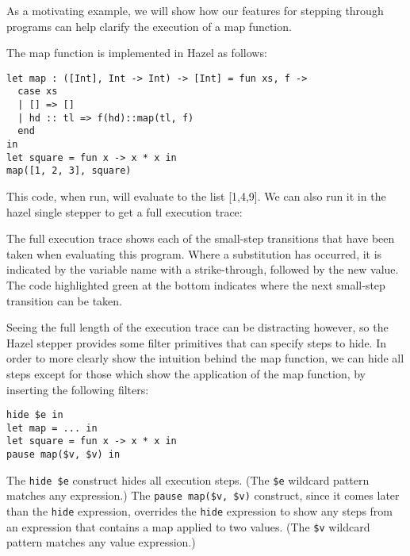 


As a motivating example, we will show how our features for stepping through programs can help clarify the execution of a map function.

The map function is implemented in Hazel as follows:

\begin{verbatim}
let map : ([Int], Int -> Int) -> [Int] = fun xs, f ->
  case xs
  | [] => []
  | hd :: tl => f(hd)::map(tl, f)
  end
in
let square = fun x -> x * x in
map([1, 2, 3], square)
\end{verbatim}

This code, when run, will evaluate to the list [1,4,9]. We can also run it in the hazel single stepper to get a full execution trace:


The full execution trace shows each of the small-step transitions that have been taken when evaluating this program. Where a substitution has occurred, it is indicated by the variable name with a strike-through, followed by the new value. The code highlighted green at the bottom indicates where the next small-step transition can be taken.

Seeing the full length of the execution trace can be distracting however, so the Hazel stepper provides some filter primitives that can specify steps to hide. In order to more clearly show the intuition behind the map function, we can hide all steps except for those which show the application of the map function, by inserting the following filters:

\begin{verbatim}
hide $e in
let map = ... in
let square = fun x -> x * x in
pause map($v, $v) in
\end{verbatim}


The \verb|hide $e| construct hides all execution steps. (The \verb|$e| wildcard pattern matches any expression.) The \verb|pause map($v, $v)| construct, since it comes later than the \verb|hide| expression, overrides the \verb|hide| expression to show any steps from an expression that contains a map applied to two values. (The \verb|$v| wildcard pattern matches any value expression.)

